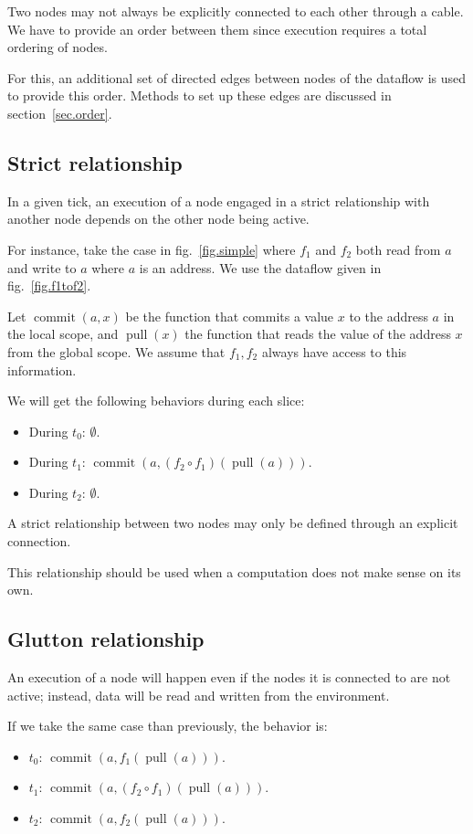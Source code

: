 \documentclass{article}
\DeclareMathOperator{\commit}{commit}
\DeclareMathOperator{\pull}{pull}
\begin{document}
Two nodes may not always be explicitly connected to each other through a cable. 
We have to provide an order between them since execution requires a total ordering of nodes.

For this, an additional set of directed edges between nodes of the dataflow is used to provide this order.
Methods to set up these edges are discussed in section~\ref{sec.order}.
\subsection{Strict relationship}
In a given tick, an execution of a node engaged in a strict relationship with another node depends on the other node being active.
        
For instance, take the case in fig.~\ref{fig.simple} where $f_1$ and $f_2$ both read from $a$ and write to $a$ where $a$ is an address.
We use the dataflow given in fig.~\ref{fig.f1tof2}.
    
Let $\commit(a, x)$ be the function that commits a value $x$ to the address $a$ in the local scope, and $\pull(x)$ the function that reads the value of the address $x$ from the global scope.
We assume that $f_1, f_2$ always have access to this information.
    
We will get the following behaviors during each slice: 
\begin{itemize}
  \item During $t_0$: $\emptyset$.
  \item During $t_1$: $\commit(a, (f_2 \circ f_1)(\pull(a)))$.
  \item During $t_2$: $\emptyset$. 
\end{itemize}

A strict relationship between two nodes may only be defined through an explicit connection.

This relationship should be used when a computation does not make sense on its own.

    
\subsection{Glutton relationship}
An execution of a node will happen even if the nodes it is connected to are not active; instead, data will be read and written from the environment.
    
If we take the same case than previously, the behavior is:
\begin{itemize}
  \item $t_0$: $\commit(a, f_1(\pull(a)))$.
  \item $t_1$: $\commit(a, (f_2 \circ f_1)(\pull(a)))$.
  \item $t_2$: $\commit(a, f_2(\pull(a)))$. 
\end{itemize}
\end{document}

